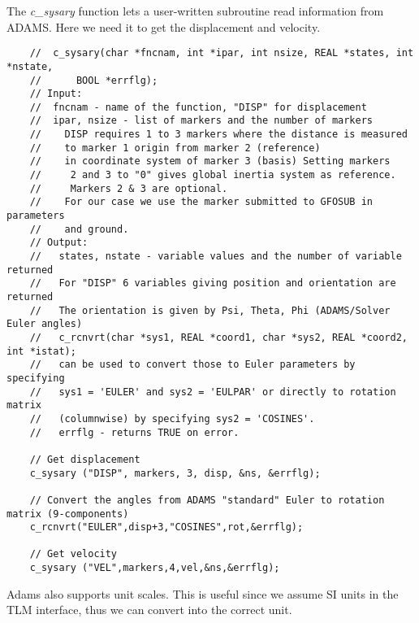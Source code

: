 The {\em c\_sysary} function lets a user-written subroutine read
information from ADAMS. Here we need it to get the displacement and
velocity.

{
\scriptsize
\begin{verbatim}
    //  c_sysary(char *fncnam, int *ipar, int nsize, REAL *states, int *nstate,
    //      BOOL *errflg);
    // Input:
    //  fncnam - name of the function, "DISP" for displacement
    //  ipar, nsize - list of markers and the number of markers
    //    DISP requires 1 to 3 markers where the distance is measured
    //    to marker 1 origin from marker 2 (reference)
    //    in coordinate system of marker 3 (basis) Setting markers
    //     2 and 3 to "0" gives global inertia system as reference.
    //     Markers 2 & 3 are optional.
    //    For our case we use the marker submitted to GFOSUB in parameters
    //    and ground.
    // Output:
    //   states, nstate - variable values and the number of variable returned
    //   For "DISP" 6 variables giving position and orientation are returned
    //   The orientation is given by Psi, Theta, Phi (ADAMS/Solver Euler angles)
    //   c_rcnvrt(char *sys1, REAL *coord1, char *sys2, REAL *coord2, int *istat);
    //   can be used to convert those to Euler parameters by specifying
    //   sys1 = 'EULER' and sys2 = 'EULPAR' or directly to rotation matrix
    //   (columnwise) by specifying sys2 = 'COSINES'.
    //   errflg - returns TRUE on error.

    // Get displacement
    c_sysary ("DISP", markers, 3, disp, &ns, &errflg);

    // Convert the angles from ADAMS "standard" Euler to rotation matrix (9-components)
    c_rcnvrt("EULER",disp+3,"COSINES",rot,&errflg);

    // Get velocity
    c_sysary ("VEL",markers,4,vel,&ns,&errflg);
\end{verbatim}
}

Adams also supports unit scales. This is useful since we assume SI
units in the TLM interface, thus we can convert into the correct unit.

